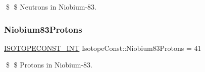 \$ \$ Neutrons in Niobium-\/83. \mbox{\label{group___isotope_const-_niobium-_nb83_gaefab291a19617733c5c9d0b7cd0625c8}} 
\subsubsection{\texorpdfstring{Niobium83\+Protons}{Niobium83Protons}}
{\footnotesize\ttfamily \mbox{\hyperlink{group___isotope_const-_macros_ga5f18360b3e99483a35c32d789e62621c}{I\+S\+O\+T\+O\+P\+E\+C\+O\+N\+S\+T\+\_\+\+I\+NT}} Isotope\+Const\+::\+Niobium83\+Protons = 41}

\$ \$ Protons in Niobium-\/83. 